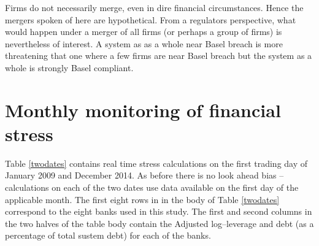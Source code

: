 \documentclass[12pt]{article}
\newcommand{\tref}[1]{Table \ref{#1}}
\begin{document}
Firms do not necessarily merge, even in dire financial circumstances.   Hence the mergers spoken of here are hypothetical.   From a regulators perspective, what would happen under a merger of all firms (or perhaps a group of firms) is nevertheless of interest.   A system as as a whole near Basel breach is more threatening that one where a few firms are near Basel breach but the system as a whole is strongly Basel compliant.

\section{Monthly monitoring  of financial stress}\label{monitoring}
 \tref{twodates} contains real time stress calculations on the first trading day of  January 2009 and December 2014.  As before there is no look ahead bias -- calculations on each of the two dates use data available on the first day of the applicable month.   The first eight rows in in the body of \tref{twodates} correspond to the eight banks used in this study.  The first  and second columns in the two halves of the table body contain the 
 Adjusted log--leverage  and debt  (as a percentage of total sustem debt) for each of the banks. 
\end{document}

